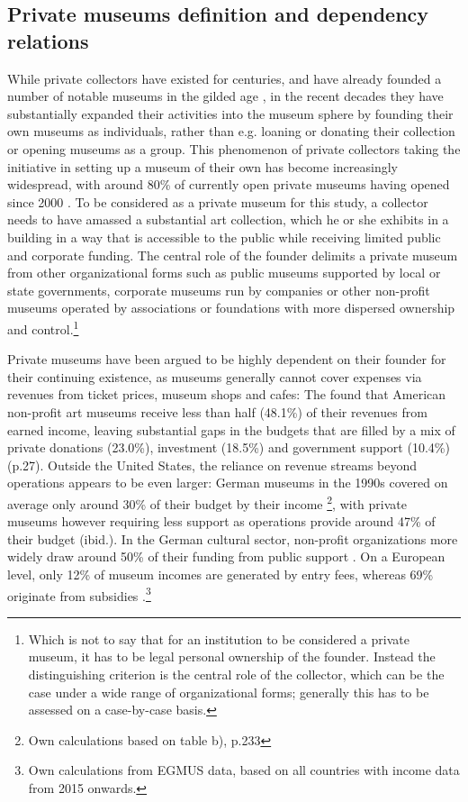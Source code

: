 \documentclass[12pt]{article}
\begin{document}
\subsection*{Private museums definition and dependency relations}






While private collectors have existed for centuries, and have already founded a number of notable museums in the gilded age \parencite{Higonnet_2003_sight,Duncan_1995_civilizing}, in the recent decades they have substantially expanded their activities into the museum sphere by founding their own museums as individuals, rather than e.g. loaning or donating their collection or opening museums as a group.
This phenomenon of private collectors taking the initiative in setting up a museum of their own has become increasingly widespread, with around 80\% of currently open private museums having opened since 2000 \parencite{Velthuis_etal_2023_boom}.
To be considered as a private museum for this study, a collector needs to have amassed a substantial art collection, which he or she exhibits in a building in a way that is accessible to the public while receiving limited public and corporate funding.
The central role of the founder delimits a private museum from other organizational forms such as public museums supported by local or state governments, corporate museums run by companies or other non-profit museums operated by associations or foundations with more dispersed ownership and control.\footnote{Which is not to say that for an institution to be considered a private museum, it has to be legal personal ownership of the founder. Instead the distinguishing criterion is the central role of the collector, which can be the case under a wide range of organizational forms; generally this has to be assessed on a case-by-case basis.}



Private museums have been argued to be highly dependent on their founder for their continuing existence, as museums generally cannot cover expenses via revenues from ticket prices, museum shops and cafes:
The \textcite{IMLS_2008_funding} found that American non-profit art museums receive less than half (48.1\%) of their revenues from earned income, leaving substantial gaps in the budgets that are filled by a mix of private donations (23.0\%), investment (18.5\%) and government support (10.4\%) (p.27).
Outside the United States, the reliance on revenue streams beyond operations appears to be even larger:
German museums in the 1990s covered on average only around 30\% of their budget by their income \parencite{Martin_1993_museen}\footnote{Own calculations based on table b), p.233}, with private museums however requiring less support as operations provide around 47\% of their budget (ibid.).
In the German cultural sector, non-profit organizations more widely draw around 50\% of their funding from public support \parencite[p.82]{Zimmer_Priller_2007_gemeinnuetzig}.
On a European level, only 12\% of museum incomes are generated by entry fees, whereas 69\% originate from subsidies \parencite{EGMUS_2024_complete}.\footnote{Own calculations from EGMUS data, based on all countries with income data from 2015 onwards.}
\end{document}

